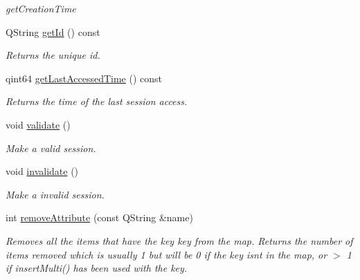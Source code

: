 \begin{DoxyCompactItemize}
\begin{DoxyCompactList}\small\item\em get\+Creation\+Time \end{DoxyCompactList}\item 
\mbox{\label{class_http_session_a358bfe548463d39bbdc167bd8c630edc}} 
Q\+String \mbox{\hyperlink{class_http_session_a358bfe548463d39bbdc167bd8c630edc}{get\+Id}} () const
\begin{DoxyCompactList}\small\item\em Returns the unique id. \end{DoxyCompactList}\item 
\mbox{\label{class_http_session_a539bf0c99bad1aae86ff9b8f411740e1}} 
qint64 \mbox{\hyperlink{class_http_session_a539bf0c99bad1aae86ff9b8f411740e1}{get\+Last\+Accessed\+Time}} () const
\begin{DoxyCompactList}\small\item\em Returns the time of the last session access. \end{DoxyCompactList}\item 
\mbox{\label{class_http_session_adc118d02431eec30977bd1cb3429eb79}} 
void \mbox{\hyperlink{class_http_session_adc118d02431eec30977bd1cb3429eb79}{validate}} ()
\begin{DoxyCompactList}\small\item\em Make a valid session. \end{DoxyCompactList}\item 
\mbox{\label{class_http_session_a1656b24f54bcd539f01022323a3c3b3c}} 
void \mbox{\hyperlink{class_http_session_a1656b24f54bcd539f01022323a3c3b3c}{invalidate}} ()
\begin{DoxyCompactList}\small\item\em Make a invalid session. \end{DoxyCompactList}\item 
\mbox{\label{class_http_session_a9102eedc7002a96cd64c080af9c4ac47}} 
int \mbox{\hyperlink{class_http_session_a9102eedc7002a96cd64c080af9c4ac47}{remove\+Attribute}} (const Q\+String \&name)
\begin{DoxyCompactList}\small\item\em Removes all the items that have the key key from the map. Returns the number of items removed which is usually 1 but will be 0 if the key isn\textquotesingle{}t in the map, or $>$ 1 if insert\+Multi() has been used with the key. \end{DoxyCompactList}\item 

\end{DoxyCompactItemize}

